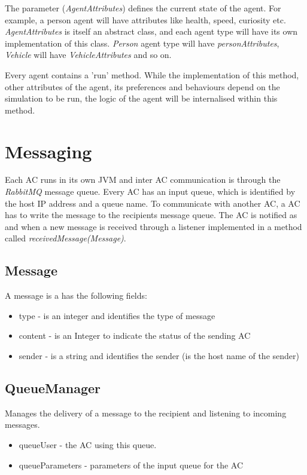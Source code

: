 The parameter (\textit{AgentAttributes}) defines the current state of
the agent.  For example, a person agent will have attributes like
health, speed, curiosity etc. \textit{AgentAttributes} is itself an
abstract class, and each agent type will have its own implementation
of this class. \textit{Person} agent type will have
\textit{personAttributes}, \textit{Vehicle} will have
\textit{VehicleAttributes} and so on.

Every agent contains a 'run' method. While the implementation of this
method, other attributes of the agent, its preferences and behaviours
depend on the simulation to be run, the logic of the agent will be
internalised within this method.

\section{ Messaging }
Each AC runs in its own JVM and inter AC communication is through the
\textit{RabbitMQ} message queue. Every AC has an input queue, which is
identified by the host IP address and a queue name. To communicate
with another AC, a AC has to write the message to the recipients
message queue. The AC is notified as and when a new message is
received through a listener implemented in a method called
\textit{receivedMessage(Message)}.

\subsection{ Message }
A message is a has the following fields:
\begin{itemize}
\item type - is an integer and identifies the type of message
\item content - is an Integer to indicate the status of the sending AC
\item sender - is a string and identifies the sender (is the host name
  of the sender)
\end{itemize}

\subsection{ QueueManager }
Manages the delivery of a message to the recipient and listening to
incoming messages.
\begin{itemize}
\item queueUser - the AC using this queue.
\item queueParameters - parameters of the input queue for the AC
\end{itemize}

